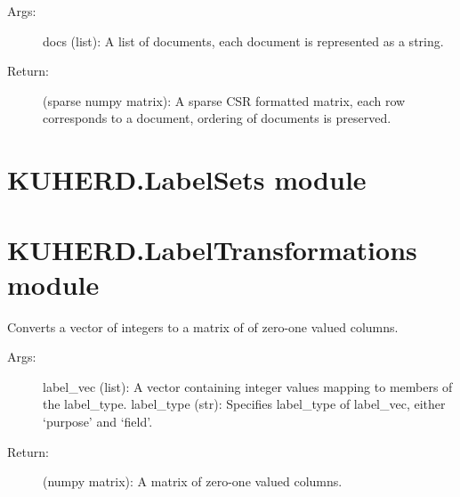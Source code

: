 \documentclass[letterpaper,10pt,english]{sphinxmanual}
\begin{document}
\begin{fulllineitems}
\begin{fulllineitems}
\begin{description}
\item[{Args:}] \leavevmode
docs (list): A list of documents, each document is represented as a string.

\item[{Return:}] \leavevmode
(sparse numpy matrix): A sparse CSR formatted matrix, each row corresponds to a document, ordering of documents is preserved.

\end{description}

\end{fulllineitems}


\end{fulllineitems}


\begin{fulllineitems}
\label{\detokenize{KUHERD:KUHERD.HerdVectorizer.main}}
\end{fulllineitems}



\section{KUHERD.LabelSets module}
\label{\detokenize{KUHERD:kuherd-labelsets-module}}\label{\detokenize{KUHERD:module-KUHERD.LabelSets}}

\section{KUHERD.LabelTransformations module}
\label{\detokenize{KUHERD:kuherd-labeltransformations-module}}\label{\detokenize{KUHERD:module-KUHERD.LabelTransformations}}

\begin{fulllineitems}
\label{\detokenize{KUHERD:KUHERD.LabelTransformations.label2mat}}
Converts a vector of integers to a matrix of of zero-one valued columns.
\begin{description}
\item[{Args:}] \leavevmode
label\_vec (list): A vector containing integer values mapping to members of the label\_type.
label\_type (str): Specifies label\_type of label\_vec, either `purpose' and `field'.

\item[{Return:}] \leavevmode
(numpy matrix): A matrix of zero-one valued columns.

\end{description}

\end{fulllineitems}
\end{document}
